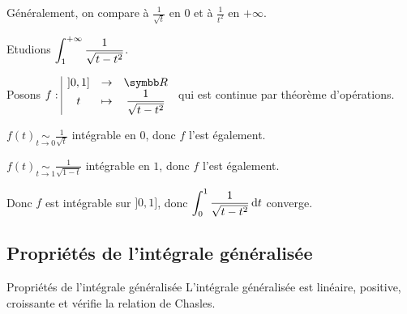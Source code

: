 \begin{remarque}
    Généralement, on compare à $\frac 1 {\sqrt t}$ en $0$ et à $\frac 1 {t^2}$ en $+ \infty$.
\end{remarque}

\begin{exemple}
    Etudions $\displaystyle \int_{1 }^{+\infty} \frac 1 { \sqrt{t - t^2}}$. 

    Posons $\fonction f {]0, 1]}{\R}{t}{\frac{1}{\sqrt{t - t^2}}}$ qui est continue par théorème d'opérations.


    \svspace $f(t) \underset{t \to 0 }{ \sim } \frac 1 {\sqrt t}$ intégrable en $0$, donc $f$ l'est également. 
    

    \svspace $f(t) \underset{t \to 1 }{ \sim } \frac 1 {\sqrt{1 - t}}$ intégrable en $1$, donc $f$ l'est également.

    \avspace Donc $f$ est intégrable sur $]0, 1]$, donc $\displaystyle \int_{0}^{1 } \frac{1}{\sqrt{t - t^2}} \,\mathrm{d}t$ converge.
\end{exemple}

\subsection{Propriétés de l'intégrale généralisée }

\begin{proposition}{Propriétés de l'intégrale généralisée}{}
    L'intégrale généralisée est linéaire, positive, croissante et vérifie la relation 
    de Chasles. 
\end{proposition}

